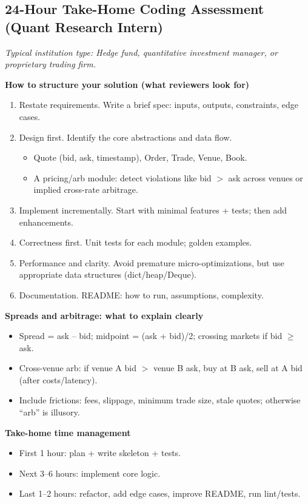\documentclass[11pt,letterpaper,openany]{book}
\newcommand{\RoleProfile}[2]{%
  \subsection{#1}%
  \noindent\textit{Typical institution type: #2.}\par
}
\begin{document}
\RoleProfile{24-Hour Take-Home Coding Assessment (Quant Research Intern)}{Hedge fund, quantitative investment manager, or proprietary trading firm}
\textbf{How to structure your solution (what reviewers look for)}
\begin{enumerate}
  \item Restate requirements. Write a brief spec: inputs, outputs, constraints, edge cases.
  \item Design first. Identify the core abstractions and data flow.
  \begin{itemize}
    \item Quote (bid, ask, timestamp), Order, Trade, Venue, Book.
    \item A pricing/arb module: detect violations like bid $>$ ask across venues or implied cross-rate arbitrage.
  \end{itemize}
  \item Implement incrementally. Start with minimal features + tests; then add enhancements.
  \item Correctness first. Unit tests for each module; golden examples.
  \item Performance and clarity. Avoid premature micro-optimizations, but use appropriate data structures (dict/heap/Deque).
  \item Documentation. README: how to run, assumptions, complexity.
\end{enumerate}

\textbf{Spreads and arbitrage: what to explain clearly}
\begin{itemize}
  \item Spread = ask -- bid; midpoint = (ask + bid)/2; crossing markets if bid $\ge$ ask.
  \item Cross-venue arb: if venue A bid $>$ venue B ask, buy at B ask, sell at A bid (after costs/latency).
  \item Include frictions: fees, slippage, minimum trade size, stale quotes; otherwise ``arb'' is illusory.
\end{itemize}

\textbf{Take-home time management}
\begin{itemize}
  \item First 1 hour: plan + write skeleton + tests.
  \item Next 3--6 hours: implement core logic.
  \item Last 1--2 hours: refactor, add edge cases, improve README, run lint/tests.
\end{itemize}
\end{document}
